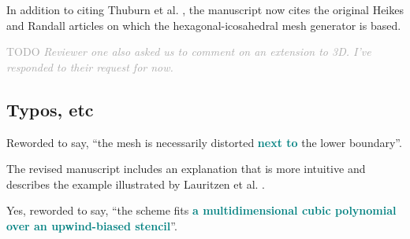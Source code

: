 \documentclass[times]{elsarticle}
\newcommand{\TODO}[1]{\textcolor{darkgray}{TODO \textit{#1}}}
\newcommand{\revtwo}[1]{\textcolor{teal}{\textbf{#1}}}
\begin{document}
In addition to citing Thuburn et al. \citep{thuburn2014}, the manuscript now cites the original Heikes and Randall articles \citep{heikes-randall1995a,heikes-randall1995b} on which the hexagonal-icosahedral mesh generator is based.

\begin{quotation}
\begin{comment}
\item Some brief comments on how the approach extends to three dimensions would be
appropriate.
\end{comment}
\end{quotation}
\TODO{Reviewer one also asked us to comment on an extension to 3D.  I've responded to their request for now.}


\subsection*{Typos, etc}

\begin{quotation}
\begin{comment}
\item Introduction, second sentence: `modification of the lower boundary' is an odd way to
think of it.
\end{comment}
\end{quotation}
Reworded to say, ``the mesh is necessarily distorted \revtwo{next to} the lower boundary''.

\begin{quotation}
\begin{comment}
\item P2, 5 lines from the bottom: `...non-simply connected domains...'. I found this
phrase confusing.
\end{comment}
\end{quotation}
The revised manuscript includes an explanation that is more intuitive and describes the example illustrated by Lauritzen et al. \citep{lauritzen2011}.

\begin{quotation}
\begin{comment}
\item P3 line 17: `cubic, upwind-biased stencil'. Surely it is the polynomial that is
cubic, rather than the stencil?
\end{comment}
\end{quotation}
Yes, reworded to say, ``the scheme fits \revtwo{a multidimensional cubic polynomial over an upwind-biased stencil}''.
\end{document}
